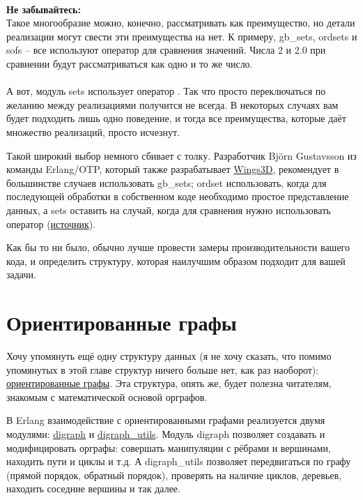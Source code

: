 \\
\colorbox{lorange}
{
    \begin{minipage}{1.0\linewidth}
        \textbf{Не забывайтесь:}\\
        Такое многообразие можно, конечно, рассматривать как преимущество, но детали реализации могут свести эти преимущества на нет.
        К примеру, gb\_sets, ordsets и sofs \--- все используют оператор \ops{==} для сравнения значений.
        Числа 2 и 2.0 при сравнении будут рассматриваться как одно и то же число.\\
        \\
        А вот, модуль sets использует оператор \ops{=:=}.
        Так что просто переключаться по желанию между реализациями получится не всегда.
        В некоторых случаях вам будет подходить лишь одно поведение, и тогда все преимущества, которые даёт множество реализаций, просто исчезнут.
    \end{minipage}
}

Такой широкий выбор немного сбивает с толку.
Разработчик Bj\"{o}rn Gustavsson из команды Erlang/OTP, который также разрабатывает \href{http://www.wings3d.com/}{Wings3D}, рекомендует в большинстве случаев использовать gb\_sets; ordset использовать, когда для последующей обработки в собственном коде необходимо простое представление данных, а sets оставить на случай, когда для сравнения нужно использовать оператор \ops{=:=} (\href{http://erlang.org/pipermail/erlang-questions/2010-March/050332.html}{источник}).

Как бы то ни было, обычно лучше провести замеры производительности вашего кода, и определить структуру, которая наилучшим образом подходит для вашей задачи.
\section{Ориентированные графы}
\label{directed-graphs}
Хочу упомянуть ещё одну структуру данных (я не хочу сказать, что помимо упомянутых в этой главе структур ничего больше нет, как раз наоборот): \href{http://en.wikipedia.org/wiki/Directed\_graph}{ориентированные графы}.
Эта структура, опять же, будет полезна читателям, знакомым с математической основой орграфов.

В Erlang взаимодействие с ориентированными графами реализуется двумя модулями: \href{http://erldocs.com/R15B/stdlib/digraph.html}{digraph} и \href{http://erldocs.com/R15B/stdlib/digraph\_utils}{digraph\_utils}.
Модуль digraph позволяет создавать и модифицировать орграфы: совершать манипуляции с рёбрами и вершинами, находить пути и циклы и т.д.
А digraph\_utils позволяет передвигаться по графу (прямой порядок, обратный порядок), проверять на наличие циклов, деревьев, находить соседние вершины и так далее.


